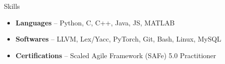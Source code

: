 \documentclass[]{mcdowellcv}
\begin{document}
	\begin{cvsection}{Skills}
		\begin{cvsubsection}{}{}{}	
			\small{
				\begin{itemize}
					\item \textbf{Languages} -- Python, C, C++, Java, JS, MATLAB
					\item \textbf{Softwares} -- LLVM, Lex/Yacc, PyTorch, Git, Bash, Linux, MySQL
					\item \textbf{Certifications} -- Scaled Agile Framework (SAFe) 5.0 Practitioner
				\end{itemize}
			}
		\end{cvsubsection}
	\end{cvsection}
	
\end{document}
